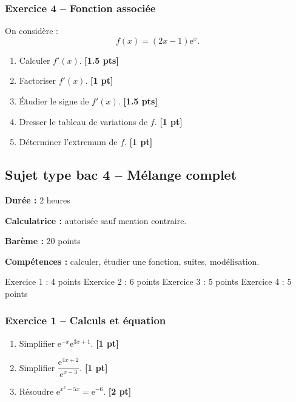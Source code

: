 \documentclass[11pt,a4paper]{article}
\newcommand{\e}{\mathrm{e}}
\newcommand{\pts}[1]{\hfill \textbf{[#1 pt]}}
\newcommand{\ptss}[1]{\hfill \textbf{[#1 pts]}}
\newcommand{\competences}[1]{\textbf{Compétences :} #1}
\newcommand{\calculatrice}{\textbf{Calculatrice :} autorisée sauf mention contraire.}
\newcommand{\duree}[1]{\textbf{Durée :} #1}
\newcommand{\bareme}[1]{\textbf{Barème :} #1}
\begin{document}
\subsubsection*{Exercice 4 -- Fonction associée}

On considère :
\[
f(x)=(2x-1)\e^x.
\]
\begin{enumerate}
    \item Calculer $f'(x)$. \ptss{1.5}
    \item Factoriser $f'(x)$. \pts{1}
    \item Étudier le signe de $f'(x)$. \ptss{1.5}
    \item Dresser le tableau de variations de $f$. \pts{1}
    \item Déterminer l'extremum de $f$. \pts{1}
\end{enumerate}

\newpage

\subsection*{Sujet type bac 4 -- Mélange complet}

\begin{sujetbox}
\duree{2 heures}

\calculatrice

\bareme{20 points}

\competences{calculer, étudier une fonction, suites, modélisation.}
\end{sujetbox}

\begin{baremebox}
Exercice 1 : 4 points \quad
Exercice 2 : 6 points \quad
Exercice 3 : 5 points \quad
Exercice 4 : 5 points
\end{baremebox}

\subsubsection*{Exercice 1 -- Calculs et équation}

\begin{enumerate}
    \item Simplifier $\e^{-x}\e^{3x+1}$. \pts{1}
    \item Simplifier $\dfrac{\e^{4x+2}}{\e^{x-3}}$. \pts{1}
    \item Résoudre $\e^{x^2-5x}=\e^{-6}$. \pts{2}
\end{enumerate}
\end{document}
